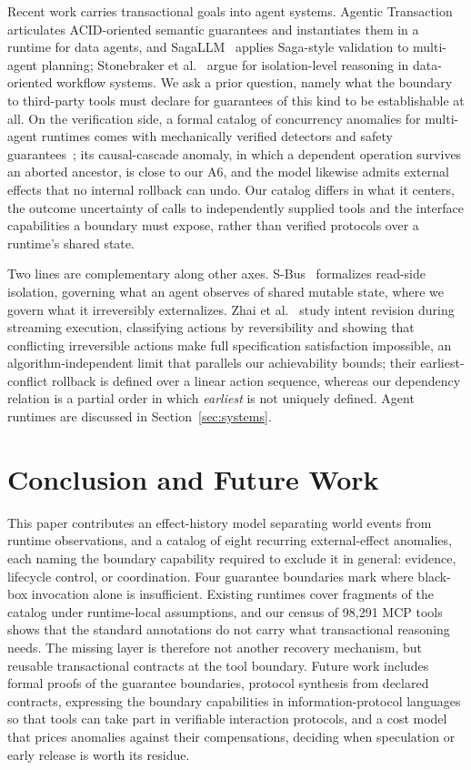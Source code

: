 \documentclass[runningheads]{comsis3}
\begin{document}
Recent work carries transactional goals into agent systems. Agentic
Transaction~\cite{sun2026agentic} articulates ACID-oriented semantic
guarantees and instantiates them in a runtime for data agents, and
SagaLLM~\cite{chang2025sagallm} applies Saga-style validation to
multi-agent planning; Stonebraker et al.~\cite{stonebraker2025consistency}
argue for isolation-level reasoning in data-oriented workflow systems. We
ask a prior question, namely what the boundary to third-party tools must
declare for guarantees of this kind to be establishable at all. On the
verification side, a formal catalog of concurrency anomalies for
multi-agent runtimes comes with mechanically verified detectors and safety
guarantees~\cite{khan2026verified}; its causal-cascade anomaly, in which a
dependent operation survives an aborted ancestor, is close to our A6, and
the model likewise admits external effects that no internal rollback can
undo. Our catalog differs in what it centers, the outcome uncertainty of
calls to independently supplied tools and the interface capabilities a
boundary must expose, rather than verified protocols over a runtime's
shared state.

Two lines are complementary along other axes. S-Bus~\cite{khan2026sbus}
formalizes read-side isolation, governing what an agent observes of shared
mutable state, where we govern what it irreversibly externalizes. Zhai et al.~\cite{zhai2026revisable} study intent revision during streaming
execution, classifying actions by reversibility and showing that
conflicting irreversible actions make full specification satisfaction
impossible, an algorithm-independent limit that parallels our achievability
bounds; their earliest-conflict rollback is defined over a linear action
sequence, whereas our dependency relation is a partial order in which
\emph{earliest} is not uniquely defined. Agent runtimes are discussed in Section~\ref{sec:systems}.

\section{Conclusion and Future Work}

This paper contributes an effect-history model separating world events
from runtime observations, and a catalog of eight recurring
external-effect anomalies, each naming the boundary capability required to exclude it in general: evidence, lifecycle control, or coordination. Four guarantee boundaries mark where black-box invocation alone is
insufficient. Existing runtimes cover fragments of the catalog under runtime-local
assumptions, and our census of 98{,}291 MCP tools shows that the standard
annotations do not carry what transactional reasoning needs. The missing layer is therefore
not another recovery mechanism, but reusable transactional contracts at the
tool boundary. Future work includes formal proofs of the guarantee
boundaries, protocol synthesis from declared contracts, expressing the
boundary capabilities in information-protocol languages so that tools can
take part in verifiable interaction protocols, and a cost model
that prices anomalies against their compensations, deciding when speculation
or early release is worth its residue.



\end{document}
